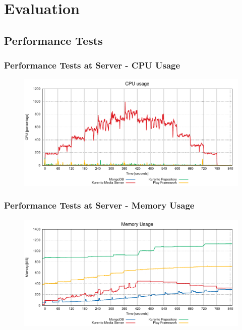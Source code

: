 \documentclass[compress]{beamer}
\begin{document}
\section{Evaluation}\label{arch}


\subsection{Performance Tests}

	\begin{frame}[c]
		\frametitle{Performance Tests at Server - CPU Usage}
		\begin{figure}[H]
			\includegraphics[width=\textwidth]{figures/cpu.pdf}
		\end{figure}
	\end{frame}
	\begin{frame}[c]
		\frametitle{Performance Tests at Server - Memory Usage}
		\begin{figure}[H]
			\includegraphics[width=\textwidth]{figures/ram.pdf}
		\end{figure}
	\end{frame}
\end{document}
